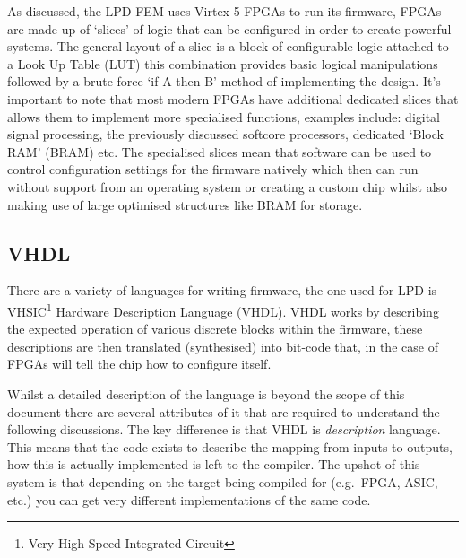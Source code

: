 As discussed, the LPD FEM uses Virtex-5 FPGAs to run its firmware, FPGAs are made up of `slices' of logic that can be configured in order to create powerful systems. The general layout of a slice is a block of configurable logic attached to a Look Up Table (LUT) this combination provides basic logical manipulations followed by a brute force `if A then B' method of implementing the design. It's important to note that most modern FPGAs have additional dedicated slices that allows them to implement more specialised functions, examples include: digital signal processing, the previously discussed softcore processors, dedicated `Block RAM' (BRAM) etc. The specialised slices mean that software can be used to control configuration settings for the firmware natively which then can run without support from an operating system or creating a custom chip whilst also making use of large optimised structures like BRAM for storage.

\subsection{VHDL} %
\label{sub:vhdl}
There are a variety of languages for writing firmware, the one used for LPD is VHSIC\footnote{Very High Speed Integrated Circuit} Hardware Description Language (VHDL). VHDL works by describing the expected operation of various discrete blocks within the firmware, these descriptions are then translated (synthesised) into bit-code that, in the case of FPGAs will tell the chip how to configure itself.

Whilst a detailed description of the language is beyond the scope of this document there are several attributes of it that are required to understand the following discussions. The key difference is that VHDL is \emph{description} language. This means that the code exists to describe the mapping from inputs to outputs, how this is actually implemented is left to the compiler. The upshot of this system is that depending on the target being compiled for (e.g.\ FPGA, ASIC, etc.) you can get very different implementations of the same code.


